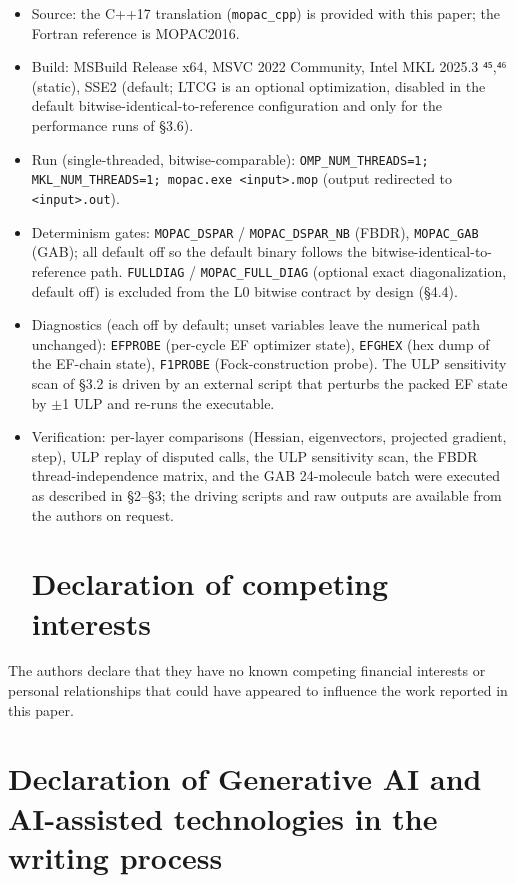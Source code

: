 \documentclass[preprint,12pt]{elsarticle}
\begin{document}
\begin{itemize}
\item Source: the C++17 translation (\texttt{mopac\_cpp}) is provided with this paper; the Fortran reference is MOPAC2016.
\item Build: MSBuild Release x64, MSVC 2022 Community, Intel MKL 2025.3 ⁴⁵,⁴⁶ (static), SSE2 (default; LTCG is an optional optimization, disabled in the default bitwise-identical-to-reference configuration and only for the performance runs of \S{}3.6).
\item Run (single-threaded, bitwise-comparable): \texttt{OMP\_NUM\_THREADS=1; MKL\_NUM\_THREADS=1; mopac.exe <input>.mop} (output redirected to \texttt{<input>.out}).
\item Determinism gates: \texttt{MOPAC\_DSPAR} / \texttt{MOPAC\_DSPAR\_NB} (FBDR), \texttt{MOPAC\_GAB} (GAB); all default off so the default binary follows the bitwise-identical-to-reference path. \texttt{FULLDIAG} / \texttt{MOPAC\_FULL\_DIAG} (optional exact diagonalization, default off) is excluded from the L0 bitwise contract by design (\S{}4.4).
\item Diagnostics (each off by default; unset variables leave the numerical path unchanged): \texttt{EFPROBE} (per-cycle EF optimizer state), \texttt{EFGHEX} (hex dump of the EF-chain state), \texttt{F1PROBE} (Fock-construction probe). The ULP sensitivity scan of \S{}3.2 is driven by an external script that perturbs the packed EF state by $\pm$1 ULP and re-runs the executable.
\item Verification: per-layer comparisons (Hessian, eigenvectors, projected gradient, step), ULP replay of disputed calls, the ULP sensitivity scan, the FBDR thread-independence matrix, and the GAB 24-molecule batch were executed as described in \S{}2--\S{}3; the driving scripts and raw outputs are available from the authors on request.


\section{Declaration of competing interests}

\end{itemize}

The authors declare that they have no known competing financial interests or personal relationships that could have appeared to influence the work reported in this paper.



\section{Declaration of Generative AI and AI-assisted technologies in the writing process}
\end{document}
